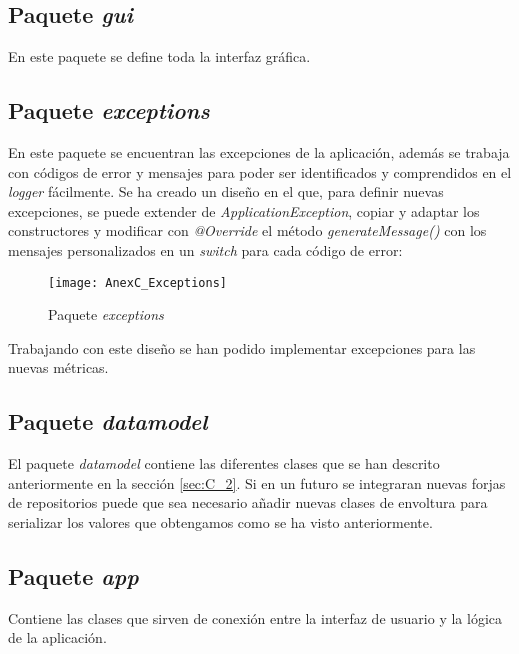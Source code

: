 

\subsection{Paquete \textit{gui}}
En este paquete se define toda la interfaz gráfica.


\subsection{Paquete \textit{exceptions}}
En este paquete se encuentran las excepciones de la aplicación, además se trabaja con códigos de error y mensajes para poder ser identificados y comprendidos en el \textit{logger} fácilmente. Se ha creado un diseño en el que, para definir nuevas excepciones, se puede extender de \textit{ApplicationException}, copiar y adaptar los constructores y modificar con \textit{@Override} el método \textit{generateMessage()} con los mensajes personalizados en un \textit{switch} para cada código de error:

\begin{figure}[!h]
	\centering
	\texttt{[image: AnexC\_Exceptions]}
	\caption{Paquete \textit{exceptions}}\label{fig:AnexC_Exceptions}
\end{figure}
\FloatBarrier

Trabajando con este diseño se han podido implementar excepciones para las nuevas métricas.

\subsection{Paquete \textit{datamodel}}
El paquete \textit{datamodel} contiene las diferentes clases que se han descrito anteriormente en la sección \ref{sec:C_2}. Si en un futuro se integraran nuevas forjas de repositorios puede que sea necesario añadir nuevas clases de envoltura para serializar los valores que obtengamos como se ha visto anteriormente.

\subsection{Paquete \textit{app}}
Contiene las clases que sirven de conexión entre la interfaz de usuario y la lógica de la aplicación.


